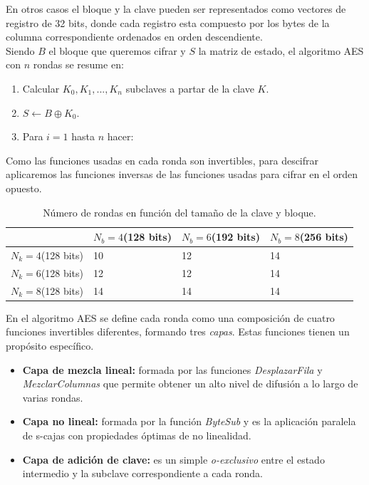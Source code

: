 En otros casos el bloque y la clave pueden ser representados como vectores de registro de 32 bits, donde cada registro esta compuesto por los bytes de la columna correspondiente ordenados en orden descendiente.\\

Siendo $B$ el bloque que queremos cifrar y $S$ la matriz de estado, el algoritmo AES con $n$ rondas se resume en:

\begin{enumerate}
	\item Calcular $K_0, K_1,...,K_n$ subclaves a partar de la clave $K$.
	\item $S\leftarrow B \oplus K_0$.
	\item Para $i=1$ hasta $n$ hacer:
\end{enumerate}
Como las funciones usadas en cada ronda son invertibles, para descifrar aplicaremos las funciones inversas de las funciones usadas para cifrar en el orden opuesto.

\begin{table}[htb]
	\begin{center}
		\begin{tabular}{| l | l | l | l |}
				\hline
				& $N_b = 4$(128 bits) & $N_b = 6$(192 bits)& $N_b = 8$(256 bits)\\ \hline
				$N_k = 4$(128 bits)& 10 & 12 & 14\\ \hline
				$N_k = 6$(128 bits)& 12 & 12 & 14\\ \hline
				$N_k = 8$(128 bits)& 14 & 14 & 14\\ \hline
		\end{tabular}
		\caption{Número de rondas en función del tamaño de la clave y bloque.}
		\label{rondas_aes}
	\end{center}
\end{table}


En el algoritmo AES se define cada ronda como una composición de cuatro funciones invertibles diferentes, formando tres \emph{capas}. Estas funciones tienen un propósito específico.
\begin{itemize}
	\item \textbf{Capa de mezcla lineal:} formada por las funciones \emph{DesplazarFila} y \emph{MezclarColumnas} que permite obtener un alto nivel de difusión a lo largo de varias rondas.
	\item \textbf{Capa no lineal:} formada por la función \emph{ByteSub} y es la aplicación paralela de s-cajas con propiedades óptimas de no linealidad.
	\item \textbf{Capa de adición de clave:} es un simple \emph{o-exclusivo} entre el estado intermedio y la subclave correspondiente a cada ronda.
\end{itemize}


